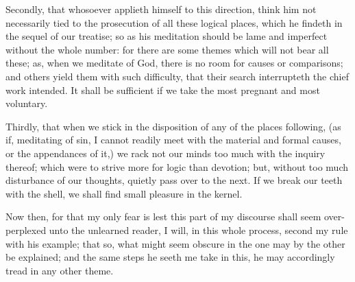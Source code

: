 Secondly, that whosoever applieth himself to this direction, think him not necessarily tied to the prosecution of all these logical places, which he findeth in the sequel of our treatise; so as his meditation should be lame and imperfect without the whole number: for there are some themes which will not bear all these; as, when we meditate of God, there is no room for causes or comparisons; and others yield them with such difficulty, that their search interrupteth the chief work intended. It shall be sufficient if we take the most pregnant and most voluntary.

Thirdly, that when we stick in the disposition of any of the places following, (as if, meditating of sin, I cannot readily meet with the material and formal causes, or the appendances of it,) we rack not our minds too much with the inquiry thereof; which were to strive more for logic than devotion; but, without too much disturbance of our thoughts, quietly pass over to the next. If we break our teeth with the shell, we shall find small pleasure in the kernel. 

Now then, for that my only fear is lest this part of my discourse shall seem over-perplexed unto the unlearned reader, I will, in this whole process, second my rule with his example; that so, what might seem obscure in the one may by the other be explained; and the same steps he seeth me take in this, he may accordingly tread in any other theme. 
